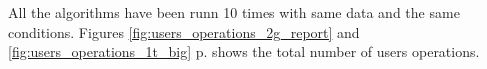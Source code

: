 All the algorithms have been runn 10 times with same data and the same conditions. Figures \ref{fig:users_operations_2g_report} and \ref{fig:users_operations_1t_big} p.\pageref{fig:users_operations_2g_report} shows the total number of users operations.


